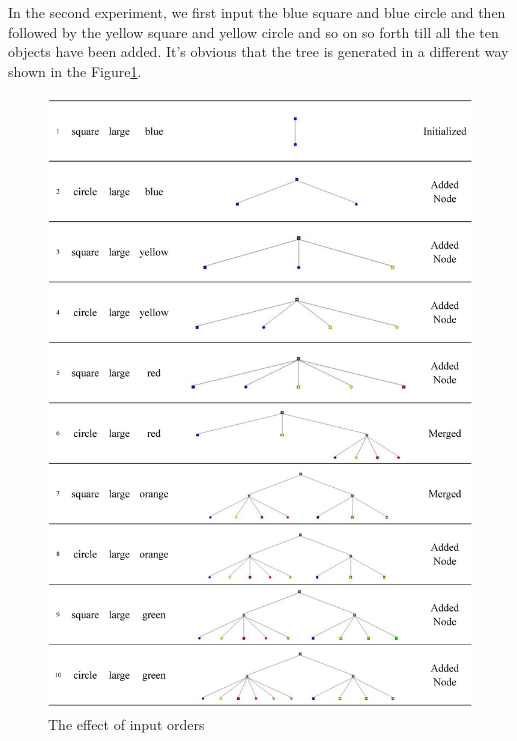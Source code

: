 In the second experiment, we first input the blue square and blue circle and then followed by the yellow square and yellow circle and so on so forth till all the ten objects have been added. It's obvious that the tree is generated in a different way shown in the Figure\ref{Fig:inputseq2}.
\begin{figure}[h!]
            \centering
            \includegraphics[width=420pt]{../images/inputseq2.jpg}
            \caption{The effect of input orders}
            \label{Fig:inputseq2}
 \end{figure}
 
